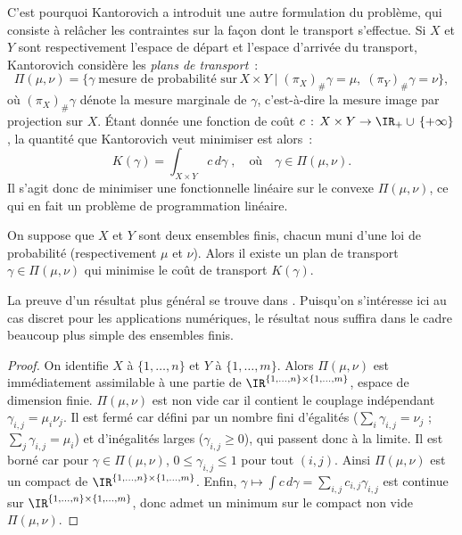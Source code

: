 C'est pourquoi Kantorovich a introduit \cite{kantorovich42} une autre formulation du problème, qui consiste à relâcher les contraintes sur la façon dont le transport s'effectue. Si $X$ et $Y$ sont respectivement l'espace de départ et l'espace d'arrivée du transport, Kantorovich considère les \emph{plans de transport}~:
\[\Pi(\mu,\nu) = \{\gamma\;\text{mesure de probabilité sur}\,X\times Y\;|\;(\pi_X)_\# \gamma = \mu,\; (\pi_Y)_\# \gamma = \nu\} , \]
où $(\pi_X)_\# \gamma$ dénote la mesure marginale de $\gamma$, c'est-à-dire la mesure image par projection sur $X$. \' Etant donnée une fonction de coût $c\, : \, X\times Y \rightarrow \IR_+\cup\,\{+\infty\}$ , la quantité que Kantorovich veut minimiser est alors~:
\begin{equation}
\label{eq:kantorovich}
K(\gamma) = \int_{X\times Y} c\,d\gamma \; ,\quad \text{où} \quad \gamma \in \Pi(\mu,\nu) .
\end{equation}
Il s'agit donc de minimiser une fonctionnelle linéaire sur le convexe $\Pi(\mu,\nu)$, ce qui en fait un problème de programmation linéaire.
\begin{theoreme}
On suppose que $X$ et $Y$ sont deux ensembles finis, chacun muni d'une loi de probabilité (respectivement $\mu$ et $\nu$). Alors il existe un plan de transport $\gamma \in \Pi(\mu,\nu)$ qui minimise le coût de transport $K(\gamma)$.
\end{theoreme}
La preuve d'un résultat plus général se trouve dans \cite{villani08}. Puisqu'on s'intéresse ici au cas discret pour les applications numériques, le résultat nous suffira dans le cadre beaucoup plus simple des ensembles finis.
\begin{proof}
On identifie $X$ à $\{1,\ldots,n\}$ et $Y$ à $\{1,\ldots,m\}$. Alors $\Pi(\mu,\nu)$ est immédiatement assimilable à une partie de $\IR^{\{1,\ldots,n\}\times\{1,\ldots,m\}}$, espace de dimension finie. $\Pi(\mu,\nu)$ est non vide car il contient le couplage indépendant $\gamma_{i,j} = \mu_i \nu_j$. Il est fermé car défini par un nombre fini d'égalités ($\sum_i \gamma_{i,j} = \nu_j$ ; $\sum_j \gamma_{i,j} = \mu_i$) et d'inégalités larges ($\gamma_{i,j} \ge 0$), qui passent donc à la limite. Il est borné car pour $\gamma \in \Pi(\mu,\nu)$, $0 \le \gamma_{i,j} \le 1$ pour tout $(i,j)$. Ainsi $\Pi(\mu,\nu)$ est un compact de $\IR^{\{1,\ldots,n\}\times\{1,\ldots,m\}}$. Enfin, $\gamma \mapsto \int c\,d\gamma = \sum_{i,j} c_{i,j} \gamma_{i,j}$ est continue sur $\IR^{\{1,\ldots,n\}\times\{1,\ldots,m\}}$, donc admet un minimum sur le compact non vide $\Pi(\mu,\nu)$.
\end{proof}

